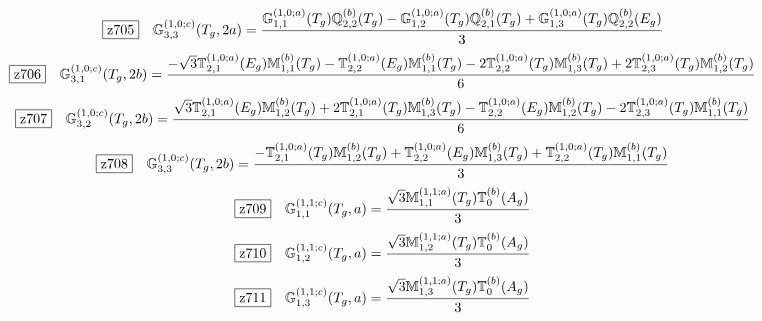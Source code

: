 \documentclass[fleqn,10pt,landscape]{jsarticle}
\begin{document}
\begin{dmath*}
\hspace*{3mm}\fbox{z705}\quad \mathbb{G}_{3,3}^{(1,0;c)}(T_{g},2a)=\frac{\mathbb{G}_{1,1}^{(1,0;a)}(T_{g}) \mathbb{Q}_{2,2}^{(b)}(T_{g}) - \mathbb{G}_{1,2}^{(1,0;a)}(T_{g}) \mathbb{Q}_{2,1}^{(b)}(T_{g}) + \mathbb{G}_{1,3}^{(1,0;a)}(T_{g}) \mathbb{Q}_{2,2}^{(b)}(E_{g})}{3}
\end{dmath*}
\begin{dmath*}
\hspace*{3mm}\fbox{z706}\quad \mathbb{G}_{3,1}^{(1,0;c)}(T_{g},2b)=\frac{- \sqrt{3} \mathbb{T}_{2,1}^{(1,0;a)}(E_{g}) \mathbb{M}_{1,1}^{(b)}(T_{g}) - \mathbb{T}_{2,2}^{(1,0;a)}(E_{g}) \mathbb{M}_{1,1}^{(b)}(T_{g}) - 2 \mathbb{T}_{2,2}^{(1,0;a)}(T_{g}) \mathbb{M}_{1,3}^{(b)}(T_{g}) + 2 \mathbb{T}_{2,3}^{(1,0;a)}(T_{g}) \mathbb{M}_{1,2}^{(b)}(T_{g})}{6}
\end{dmath*}
\begin{dmath*}
\hspace*{3mm}\fbox{z707}\quad \mathbb{G}_{3,2}^{(1,0;c)}(T_{g},2b)=\frac{\sqrt{3} \mathbb{T}_{2,1}^{(1,0;a)}(E_{g}) \mathbb{M}_{1,2}^{(b)}(T_{g}) + 2 \mathbb{T}_{2,1}^{(1,0;a)}(T_{g}) \mathbb{M}_{1,3}^{(b)}(T_{g}) - \mathbb{T}_{2,2}^{(1,0;a)}(E_{g}) \mathbb{M}_{1,2}^{(b)}(T_{g}) - 2 \mathbb{T}_{2,3}^{(1,0;a)}(T_{g}) \mathbb{M}_{1,1}^{(b)}(T_{g})}{6}
\end{dmath*}
\begin{dmath*}
\hspace*{3mm}\fbox{z708}\quad \mathbb{G}_{3,3}^{(1,0;c)}(T_{g},2b)=\frac{- \mathbb{T}_{2,1}^{(1,0;a)}(T_{g}) \mathbb{M}_{1,2}^{(b)}(T_{g}) + \mathbb{T}_{2,2}^{(1,0;a)}(E_{g}) \mathbb{M}_{1,3}^{(b)}(T_{g}) + \mathbb{T}_{2,2}^{(1,0;a)}(T_{g}) \mathbb{M}_{1,1}^{(b)}(T_{g})}{3}
\end{dmath*}
\begin{dmath*}
\hspace*{3mm}\fbox{z709}\quad \mathbb{G}_{1,1}^{(1,1;c)}(T_{g},a)=\frac{\sqrt{3} \mathbb{M}_{1,1}^{(1,1;a)}(T_{g}) \mathbb{T}_{0}^{(b)}(A_{g})}{3}
\end{dmath*}
\begin{dmath*}
\hspace*{3mm}\fbox{z710}\quad \mathbb{G}_{1,2}^{(1,1;c)}(T_{g},a)=\frac{\sqrt{3} \mathbb{M}_{1,2}^{(1,1;a)}(T_{g}) \mathbb{T}_{0}^{(b)}(A_{g})}{3}
\end{dmath*}
\begin{dmath*}
\hspace*{3mm}\fbox{z711}\quad \mathbb{G}_{1,3}^{(1,1;c)}(T_{g},a)=\frac{\sqrt{3} \mathbb{M}_{1,3}^{(1,1;a)}(T_{g}) \mathbb{T}_{0}^{(b)}(A_{g})}{3}
\end{dmath*}
\end{document}
